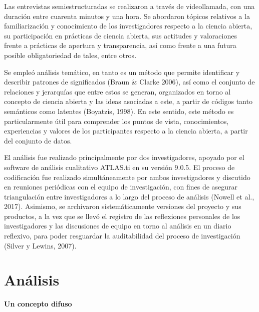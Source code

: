 \documentclass[
  letterpaper,
  DIV=11,
  numbers=noendperiod]{scrreprt}
\begin{document}
Las entrevistas semiestructuradas se realizaron a través de
videollamada, con una duración entre cuarenta minutos y una hora. Se
abordaron tópicos relativos a la familiarización y conocimiento de los
investigadores respecto a la ciencia abierta, su participación en
prácticas de ciencia abierta, sus actitudes y valoraciones frente a
prácticas de apertura y transparencia, así como frente a una futura
posible obligatoriedad de tales, entre otros.

Se empleó análisis temático, en tanto es un método que permite
identificar y describir patrones de significados (Braun \& Clarke 2006),
así como el conjunto de relaciones y jerarquías que entre estos se
generan, organizados en torno al concepto de ciencia abierta y las ideas
asociadas a este, a partir de códigos tanto semánticos como latentes
(Boyatzis, 1998). En este sentido, este método es particularmente útil
para comprender los puntos de vista, conocimientos, experiencias y
valores de los participantes respecto a la ciencia abierta, a partir del
conjunto de datos.

El análisis fue realizado principalmente por dos investigadores, apoyado
por el software de análisis cualitativo ATLAS.ti en su versión 9.0.5. El
proceso de codificación fue realizado simultáneamente por ambos
investigadores y discutido en reuniones periódicas con el equipo de
investigación, con fines de asegurar triangulación entre investigadores
a lo largo del proceso de análisis (Nowell et al., 2017). Asimismo, se
archivaron sistemáticamente versiones del proyecto y sus productos, a la
vez que se llevó el registro de las reflexiones personales de los
investigadores y las discusiones de equipo en torno al análisis en un
diario reflexivo, para poder resguardar la auditabilidad del proceso de
investigación (Silver y Lewins, 2007).


\chapter{Análisis}\label{anuxe1lisis}

\textbf{Un concepto difuso}
\end{document}
